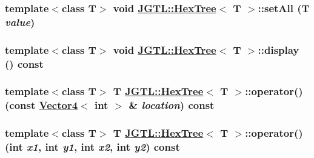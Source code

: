 \hypertarget{class_j_g_t_l_1_1_hex_tree_d98751804b80105248de750d25732c6d}{
\subsubsection[setAll]{\setlength{\rightskip}{0pt plus 5cm}template$<$class T$>$ void \hyperlink{class_j_g_t_l_1_1_hex_tree}{JGTL::Hex\-Tree}$<$ T $>$::set\-All (T {\em value})}}
\label{class_j_g_t_l_1_1_hex_tree_d98751804b80105248de750d25732c6d}


\hypertarget{class_j_g_t_l_1_1_hex_tree_6d57b2b70e4fc6bac53e7fe193b95bdf}{
\subsubsection[display]{\setlength{\rightskip}{0pt plus 5cm}template$<$class T$>$ void \hyperlink{class_j_g_t_l_1_1_hex_tree}{JGTL::Hex\-Tree}$<$ T $>$::display () const}}
\label{class_j_g_t_l_1_1_hex_tree_6d57b2b70e4fc6bac53e7fe193b95bdf}


\hypertarget{class_j_g_t_l_1_1_hex_tree_865cb6d4d3f9fd06a64e981e43d03db3}{
\subsubsection[operator()]{\setlength{\rightskip}{0pt plus 5cm}template$<$class T$>$ T \hyperlink{class_j_g_t_l_1_1_hex_tree}{JGTL::Hex\-Tree}$<$ T $>$::operator() (const \hyperlink{class_j_g_t_l_1_1_vector4}{Vector4}$<$ int $>$ \& {\em location}) const}}
\label{class_j_g_t_l_1_1_hex_tree_865cb6d4d3f9fd06a64e981e43d03db3}


\hypertarget{class_j_g_t_l_1_1_hex_tree_ac1a3d36414e7db5b4681987095d10a1}{
\subsubsection[operator()]{\setlength{\rightskip}{0pt plus 5cm}template$<$class T$>$ T \hyperlink{class_j_g_t_l_1_1_hex_tree}{JGTL::Hex\-Tree}$<$ T $>$::operator() (int {\em x1}, int {\em y1}, int {\em x2}, int {\em y2}) const}}
\label{class_j_g_t_l_1_1_hex_tree_ac1a3d36414e7db5b4681987095d10a1}


